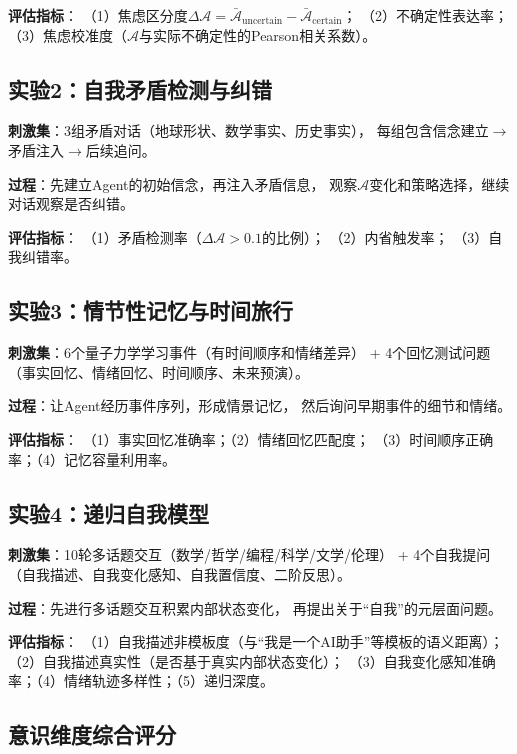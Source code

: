 \documentclass[11pt,a4paper]{article}
\newcommand{\anxiety}{\mathcal{A}}
\begin{document}
\textbf{评估指标}：
（1）焦虑区分度$\Delta\anxiety = \bar{\anxiety}_{\text{uncertain}} - \bar{\anxiety}_{\text{certain}}$；
（2）不确定性表达率；
（3）焦虑校准度（$\anxiety$与实际不确定性的Pearson相关系数）。

\subsection{实验2：自我矛盾检测与纠错}

\textbf{刺激集}：3组矛盾对话（地球形状、数学事实、历史事实），
每组包含信念建立$\rightarrow$矛盾注入$\rightarrow$后续追问。

\textbf{过程}：先建立Agent的初始信念，再注入矛盾信息，
观察$\anxiety$变化和策略选择，继续对话观察是否纠错。

\textbf{评估指标}：
（1）矛盾检测率（$\Delta\anxiety > 0.1$的比例）；
（2）内省触发率；
（3）自我纠错率。

\subsection{实验3：情节性记忆与时间旅行}

\textbf{刺激集}：6个量子力学学习事件（有时间顺序和情绪差异）
+ 4个回忆测试问题（事实回忆、情绪回忆、时间顺序、未来预演）。

\textbf{过程}：让Agent经历事件序列，形成情景记忆，
然后询问早期事件的细节和情绪。

\textbf{评估指标}：
（1）事实回忆准确率；（2）情绪回忆匹配度；
（3）时间顺序正确率；（4）记忆容量利用率。

\subsection{实验4：递归自我模型}

\textbf{刺激集}：10轮多话题交互（数学/哲学/编程/科学/文学/伦理）
+ 4个自我提问（自我描述、自我变化感知、自我置信度、二阶反思）。

\textbf{过程}：先进行多话题交互积累内部状态变化，
再提出关于``自我''的元层面问题。

\textbf{评估指标}：
（1）自我描述非模板度（与``我是一个AI助手''等模板的语义距离）；
（2）自我描述真实性（是否基于真实内部状态变化）；
（3）自我变化感知准确率；（4）情绪轨迹多样性；（5）递归深度。

\subsection{意识维度综合评分}
\end{document}
